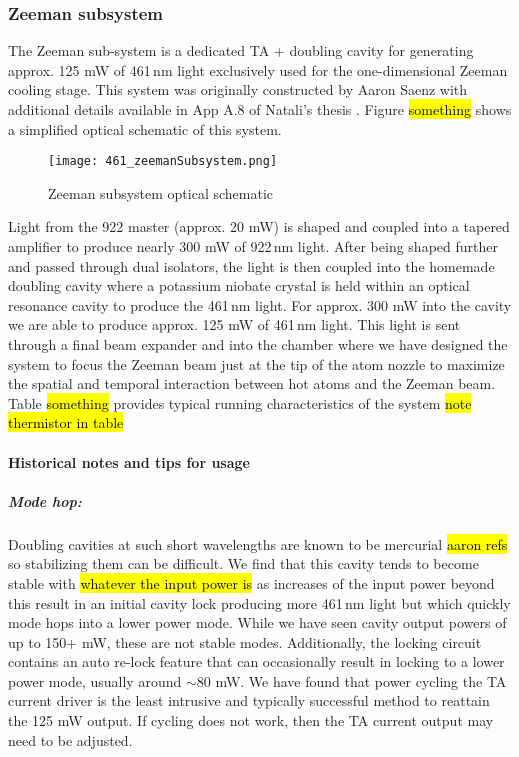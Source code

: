 \subsubsection{Zeeman subsystem}
The Zeeman sub-system is a dedicated TA + doubling cavity for generating approx. 125 mW of 461\,nm light exclusively used for the one-dimensional Zeeman cooling stage.
This system was originally constructed by Aaron Saenz \cite{AaronDSaenz2005} with additional details available in App A.8 of Natali's thesis \cite{MartinezdeEscolar2010}.
Figure \hl{something} shows a simplified optical schematic of this system.
	\begin{figure} 
		\centerline{
		\texttt{[image: 461\_zeemanSubsystem.png]}}
		\caption{Zeeman subsystem optical schematic}
		\label{fig:zeemanSchematic}
	\end{figure}
Light from the 922 master (approx. 20 mW) is shaped and coupled into a tapered amplifier to produce nearly 300 mW of 922\,nm light.
After being shaped further and passed through dual isolators, the light is then coupled into the homemade doubling cavity where a potassium niobate crystal is held within an optical resonance cavity to produce the 461\,nm light.
For approx. 300 mW into the cavity we are able to produce approx. 125 mW of 461\,nm light.
This light is sent through a final beam expander and into the chamber where we have designed the system to focus the Zeeman beam just at the tip of the atom nozzle to maximize the spatial and temporal interaction between hot atoms and the Zeeman beam.
Table \hl{something} provides typical running characteristics of the system \hl{note thermistor in table}

\paragraph{Historical notes and tips for usage}
\subparagraph{Mode hop:} 
Doubling cavities at such short wavelengths are known to be mercurial \hl{aaron refs} so stabilizing them can be difficult. 
We find that this cavity tends to become stable with \hl{whatever the input power is} as increases of the input power beyond this result in an initial cavity lock producing more 461\,nm light but which quickly mode hops into a lower power mode.
While we have seen cavity output powers of up to 150+ mW, these are not stable modes.
Additionally, the locking circuit contains an auto re-lock feature that can occasionally result in locking to a lower power mode, usually around $\sim$80 mW.
We have found that power cycling the TA current driver is the least intrusive and typically successful method to reattain the 125 mW output.
If cycling does not work, then the TA current output may need to be adjusted.

